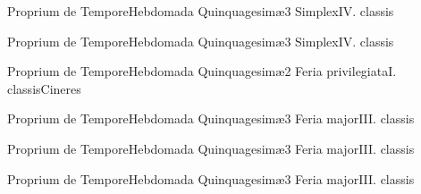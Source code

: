\documentclass[liber-responsorialis_hiemalis.tex]{subfiles}
\begin{document}
	{Proprium de Tempore}{Hebdomada Quinquagesimæ}{3}{}
	{Simplex}{IV. classis}{}
	{}
	{}

	{Proprium de Tempore}{Hebdomada Quinquagesimæ}{3}{}
	{Simplex}{IV. classis}{}
	{}
	{}

	{Proprium de Tempore}{Hebdomada Quinquagesimæ}{2}{}
	{Feria privilegiata}{I. classis}{Cineres}
	{}
	{}

	{Proprium de Tempore}{Hebdomada Quinquagesimæ}{3}{}
	{Feria major}{III. classis}{}
	{}
	{}

	{Proprium de Tempore}{Hebdomada Quinquagesimæ}{3}{}
	{Feria major}{III. classis}{}
	{}
	{}

	{Proprium de Tempore}{Hebdomada Quinquagesimæ}{3}{}
	{Feria major}{III. classis}{}
	{}
	{}
\end{document}
